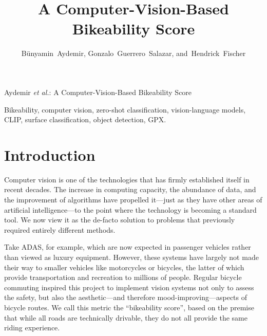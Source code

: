 \documentclass[letterpaper,journal]{IEEEtran}
\begin{document}
\title{A Computer-Vision-Based Bikeability Score}

\author{Bünyamin~Aydemir,
        Gonzalo~Guerrero~Salazar,
        and~Hendrick~Fischer}

%
{Aydemir \MakeLowercase{\textit{et al.}}: A Computer-Vision-Based Bikeability Score}

\maketitle

\begin{IEEEkeywords}
Bikeability, computer vision, zero-shot classification, vision-language models,
CLIP, surface classification, object detection, GPX.
\end{IEEEkeywords}


\section{Introduction}

Computer vision is one of the technologies that has firmly established
itself in recent decades.
The increase in computing capacity, the abundance of data, and the
improvement of algorithms have propelled it---just as they have other
areas of artificial intelligence---to the point where the technology is
becoming a standard tool.
We now view it as the de-facto solution to problems that previously
required entirely different methods.

Take ADAS, for example, which are now expected in passenger vehicles
rather than viewed as luxury equipment.
However, these systems have largely not made their way to smaller
vehicles like motorcycles or bicycles, the latter of which provide
transportation and recreation to millions of people.
Regular bicycle commuting inspired this project to implement vision
systems not only to assess the safety, but also the aesthetic---and
therefore mood-improving---aspects of bicycle routes.
We call this metric the \enquote{bikeability score}, based on the
premise that while all roads are technically drivable, they do not all
provide the same riding experience.
\end{document}
